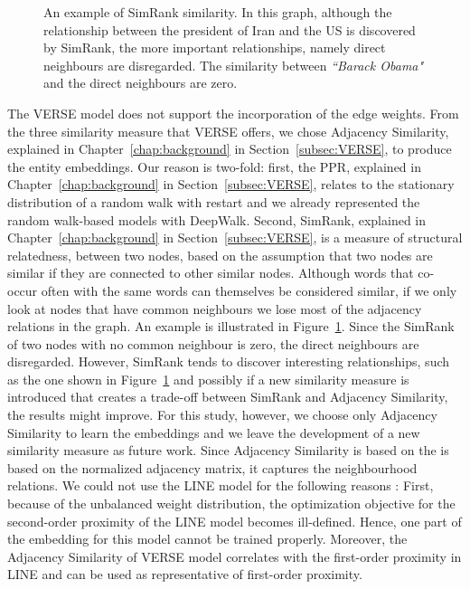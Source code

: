 \begin{figure}
\centering 
\resizebox{0.50\textwidth}{0.35\textwidth}{      

}
\caption{An example of SimRank similarity. In this graph, although the relationship between the president of Iran and the US is discovered by SimRank, the more important relationships, namely direct neighbours are disregarded. The similarity between \emph{``Barack Obama"} and the direct neighbours are zero.}
\label{fig:simrank}
\end{figure}
\noindent
The VERSE model does not support the incorporation of the edge weights. From the three similarity measure that VERSE offers, we chose Adjacency Similarity, explained in Chapter~\ref{chap:background} in Section~\ref{subsec:VERSE}, to produce the entity embeddings. Our reason is two-fold: first, the PPR, explained in Chapter~\ref{chap:background} in Section~\ref{subsec:VERSE}, relates to the stationary distribution of a random walk with restart and we already represented the random walk-based models with DeepWalk.
Second, SimRank, explained in Chapter~\ref{chap:background} in Section~\ref{subsec:VERSE}, is a measure of structural relatedness, between two nodes, based on the assumption that two nodes are similar if they are connected to other similar nodes. Although words that co-occur often with the same words can themselves be considered similar, if we only look at nodes that have common neighbours we lose most of the adjacency relations in the graph. An example is illustrated in Figure~\ref{fig:simrank}. Since the SimRank of two nodes with no common neighbour is zero, the direct neighbours are disregarded. However, SimRank tends to discover interesting relationships, such as the one shown in Figure~\ref{fig:simrank} and possibly if a new similarity measure is introduced that creates a trade-off between SimRank and Adjacency Similarity, the results might improve. For this study, however, we choose only Adjacency Similarity to learn the embeddings and we leave the development of a new similarity measure as future work. 
Since Adjacency Similarity is based on the is based on the normalized adjacency matrix, it captures the neighbourhood relations.
We could not use the LINE model for the following reasons : First, because of the unbalanced weight distribution, the optimization objective for the second-order proximity of the LINE model becomes ill-defined. Hence, one part of the embedding for this model cannot be trained properly. Moreover, the Adjacency Similarity of VERSE model correlates with the first-order proximity in LINE and can be used as representative of first-order proximity.  \\
